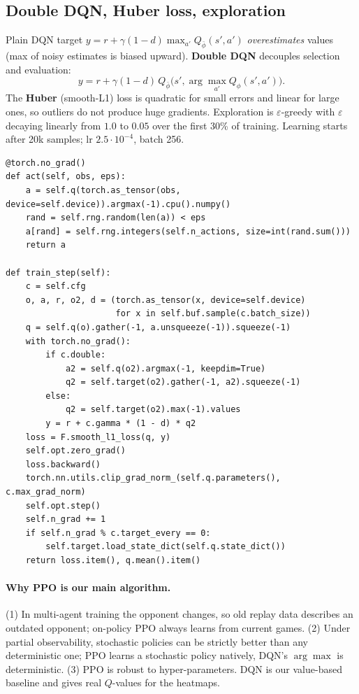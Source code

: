 \documentclass[11pt,a4paper]{article}
\newcommand{\code}[1]{\texttt{#1}}
\begin{document}
\subsection{Double DQN, Huber loss, exploration}
Plain DQN target $y=r+\gamma(1-d)\max_{a'}Q_{\bar\phi}(s',a')$ \emph{overestimates} values
(max of noisy estimates is biased upward). \textbf{Double DQN} decouples selection and evaluation:
\[
y=r+\gamma(1-d)\,Q_{\bar\phi}\big(s',\arg\max_{a'}Q_\phi(s',a')\big).
\]
The \textbf{Huber} (smooth-L1) loss is quadratic for small errors and linear for large ones,
so outliers do not produce huge gradients. Exploration is $\varepsilon$-greedy with $\varepsilon$
decaying linearly from $1.0$ to $0.05$ over the first 30\% of training. Learning starts after
20k samples; lr $2.5\cdot10^{-4}$, batch 256.

\begin{lstlisting}[title={\code{rl/dqn.py} -- DQN.act and DQN.train\_step (exact)}]
@torch.no_grad()
def act(self, obs, eps):
    a = self.q(torch.as_tensor(obs, device=self.device)).argmax(-1).cpu().numpy()
    rand = self.rng.random(len(a)) < eps
    a[rand] = self.rng.integers(self.n_actions, size=int(rand.sum()))
    return a

def train_step(self):
    c = self.cfg
    o, a, r, o2, d = (torch.as_tensor(x, device=self.device)
                      for x in self.buf.sample(c.batch_size))
    q = self.q(o).gather(-1, a.unsqueeze(-1)).squeeze(-1)
    with torch.no_grad():
        if c.double:
            a2 = self.q(o2).argmax(-1, keepdim=True)
            q2 = self.target(o2).gather(-1, a2).squeeze(-1)
        else:
            q2 = self.target(o2).max(-1).values
        y = r + c.gamma * (1 - d) * q2
    loss = F.smooth_l1_loss(q, y)
    self.opt.zero_grad()
    loss.backward()
    torch.nn.utils.clip_grad_norm_(self.q.parameters(), c.max_grad_norm)
    self.opt.step()
    self.n_grad += 1
    if self.n_grad % c.target_every == 0:
        self.target.load_state_dict(self.q.state_dict())
    return loss.item(), q.mean().item()
\end{lstlisting}

\paragraph{Why PPO is our main algorithm.} (1) In multi-agent training the opponent changes, so
old replay data describes an outdated opponent; on-policy PPO always learns from current games.
(2) Under partial observability, stochastic policies can be strictly better than any deterministic
one; PPO learns a stochastic policy natively, DQN's $\arg\max$ is deterministic.
(3) PPO is robust to hyper-parameters. DQN is our value-based baseline and gives real $Q$-values
for the heatmaps.
\end{document}
